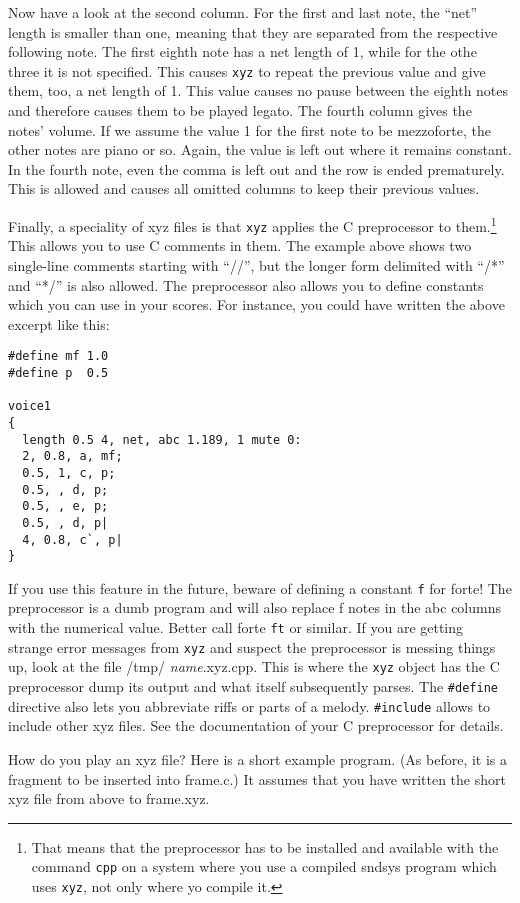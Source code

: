 \documentclass{article}
\def\s{{\sc sndsys} }
\def\bv{\begin{verbatim}}
\begin{document}
Now have a look at the second column.  For the first and last note, the ``net''
length is smaller than one, meaning that they are separated from the respective
following note.  The first eighth note has a net length of 1, while for the
othe three it is not specified.  This causes {\tt xyz} to repeat the previous
value and give them, too, a net length of 1.  This value causes no pause
between the eighth notes and therefore causes them to be played legato.  The
fourth column gives the notes' volume.  If we assume the value 1 for the first
note to be mezzoforte, the other notes are piano or so.  Again, the value is
left out where it remains constant.  In the fourth note, even the comma is left
out and the row is ended prematurely.  This is allowed and causes all omitted
columns to keep their previous values.

Finally, a speciality of xyz files is that {\tt xyz} applies the C preprocessor
to them.\footnote{That means that the preprocessor has to be installed and
available with the command {\tt cpp} on a system where you use a compiled \s
program which uses {\tt xyz}, not only where yo compile it.}  This allows you
to use C comments in them.  The example above shows two single-line comments
starting with ``//'', but the longer form delimited with ``/*'' and ``*/'' is
also allowed.  The preprocessor also allows you to define constants which you
can use in your scores.  For instance, you could have written the above excerpt
like this:

\bv
#define mf 1.0
#define p  0.5

voice1
{
  length 0.5 4, net, abc 1.189, 1 mute 0:
  2, 0.8, a, mf;
  0.5, 1, c, p;
  0.5, , d, p;
  0.5, , e, p;
  0.5, , d, p|
  4, 0.8, c`, p|
}
\end{verbatim}

If you use this feature in the future, beware of defining a constant {\tt f}
for forte!  The preprocessor is a dumb program and will also replace f notes in
the abc columns with the numerical value.  Better call forte {\tt ft} or
similar.  If you are getting strange error messages from {\tt xyz} and suspect
the preprocessor is messing things up, look at the file /tmp/{\it
name}.xyz.cpp.  This is where the {\tt xyz} object has the C preprocessor dump
its output and what itself subsequently parses.  The {\tt \#define} directive
also lets you abbreviate riffs or parts of a melody.  {\tt \#include} allows to
include other xyz files.  See the documentation of your C preprocessor for
details.

How do you play an xyz file?  Here is a short example program.  (As before, it
is a fragment to be inserted into frame.c.)  It assumes that you have written
the short xyz file from above to frame.xyz.
\end{document}
